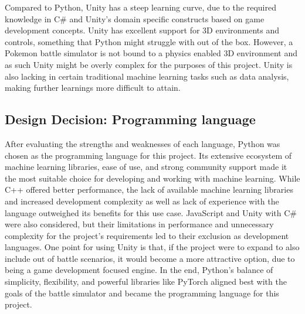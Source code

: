 Compared to Python, Unity has a steep learning curve,
due to the required knowledge in C\# and Unity's domain specific constructs based on game development concepts. Unity has excellent support for 3D environments and controls,
something that Python might struggle with out of the box. However, a Pokemon battle simulator is not bound to a physics enabled 3D environment and as such
Unity might be overly complex for the purposes of this project.
Unity is also lacking in certain traditional machine learning tasks such as data analysis, making further learnings more difficult to attain.  

\subsection{Design Decision: Programming language}
After evaluating the strengths and weaknesses of each language, Python was chosen as the programming language for this project. 
Its extensive ecosystem of machine learning libraries, ease of use, and strong community support made it the most suitable choice for developing
and working with machine learning. While C++ offered better performance, the lack of available machine learning libraries and
increased development complexity as well as lack of experience with the language outweighed its benefits for this use case. JavaScript and 
Unity with C\# were also considered, but their limitations in performance and unnecessary complexity for the project's requirements led to 
their exclusion as development languages. One point for using Unity is that, if the project were to expand to also include out of battle scenarios, it 
would become a more attractive option, due to being a game development focused engine.
In the end, Python's balance of simplicity, flexibility, and powerful libraries like PyTorch aligned best with the goals of the battle simulator and became the 
programming language for this project.
